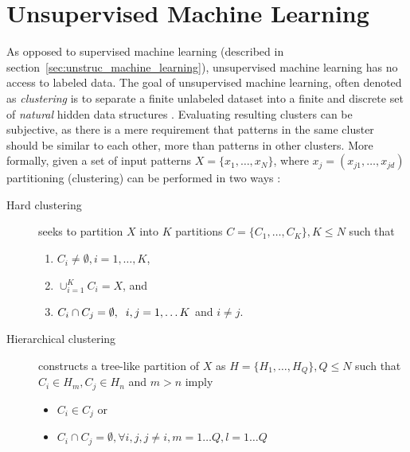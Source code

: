 \section{Unsupervised Machine Learning}
\label{sec:unsupervised_machine_learning}

As opposed to supervised machine learning (described in
section~\ref{sec:unstruc_machine_learning}), unsupervised machine learning
has no access to labeled data. The goal of unsupervised machine learning,
often denoted as \textit{clustering} is to separate 
a finite unlabeled dataset into a finite and discrete set of 
\textit{natural} hidden data structures \citep{xu2005survey}.
Evaluating resulting clusters can be subjective, as there is a mere 
requirement that patterns in the same cluster should be similar to each
other, more than patterns in other clusters. More formally, 
given a set of input patterns $X = \{x_1, \dots, x_N\}$, where
$x_j = (x_{j1}, \dots, x_{jd})$ partitioning (clustering) can 
be performed in two ways \citep{xu2005survey}:
\begin{description}
\item[Hard clustering] seeks to partition $X$ into $K$ partitions $C=\{C_1,
	\dots, C_K\}, K \leq N$ such that 
	\begin{enumerate}
	\item $C_i \neq \emptyset, i = 1, \dots, K$, 
	\item $\cup_{i=1}^{K} C_i = X$, and
	\item $C_i \cap C_j = \emptyset, \hspace{0.2cm}i, j = 1, \dots K$ and $i \neq j$.
	\end{enumerate}
\item[Hierarchical clustering] constructs a tree-like partition of $X$ as 
	$H = \{H_1, \dots, H_Q\}, Q \leq N$ such that
	$C_i \in H_m, C_j \in H_n$ and $m > n$
	imply 
	\begin{itemize}
	\item $C_i \in C_j$ or 
	\item $C_i \cap C_j = \emptyset, \forall i, j, j \neq
		i, m = 1 \dots Q, l = 1 \dots Q$
	\end{itemize}
\end{description}


